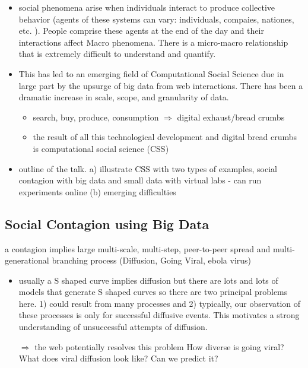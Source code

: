 \begin{itemize}

\item social phenomena arise when individuals interact to produce collective behavior (agents of these systems can vary: individuals, compaies, nationes, etc. ).  People comprise these agents at the end of the day and their interactions affect Macro phenomena.  There is a micro-macro relationship that is extremely difficult to understand and quantify.  
\item This has led to an emerging field of Computational Social Science due in large part by the upsurge of big data from web interactions.  There has been a dramatic increase in scale, scope, and granularity of data.  
 \begin{itemize}
 \item search, buy, produce, consumption $\Rightarrow$ digital exhaust/bread crumbs
 \item the result of all this technological development and digital bread crumbs is computational social science (CSS)
 \end{itemize}
\item outline of the talk.  a) illustrate CSS with two types of examples, social contagion with big data and small data with virtual labs - can run experiments online (b) emerging difficulties

\end{itemize}

\subsection{Social Contagion using Big Data}
a contagion implies large multi-scale, multi-step, peer-to-peer spread and multi-generational branching process (Diffusion, Going Viral, ebola virus)

 \begin{itemize}
 \item usually a S shaped curve implies diffusion but there are lots and lots of models that generate S shaped curves so there are two principal problems here.  1) could result from many processes and 2) typically, our observation of these processes is only for successful diffusive events.  This motivates a strong understanding of unsuccessful attempts of diffusion.  
 
 $\Rightarrow$ the web potentially resolves this problem
 How diverse is going viral?  
 What does viral diffusion look like? 
 Can we predict it? 
\end{itemize}

